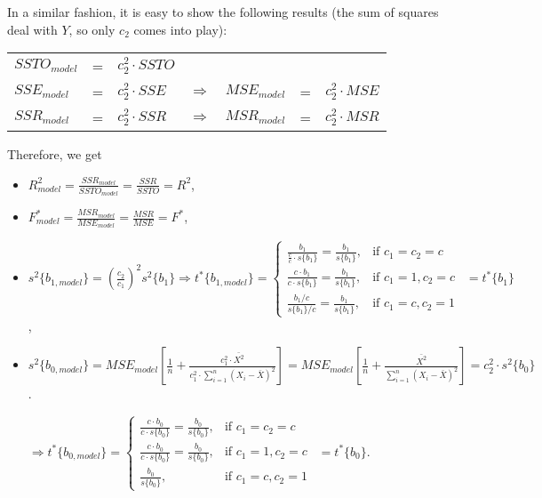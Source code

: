 \documentclass[]{article}
\begin{document}
In a similar fashion, it is easy to show the following results (the sum of squares deal with $Y$, so only $c_2$ comes into play):

\begin{tabular}{lclcccc}
$SSTO_{model}$ & = & $c_2^2 \cdot SSTO$\\
$SSE_{model}$ & = & $c_2^2 \cdot SSE$ & $\Rightarrow$ & $MSE_{model}$ & = & $c_2^2 \cdot MSE$\\
$SSR_{model}$ & = & $c_2^2 \cdot SSR$ & $\Rightarrow$ & $MSR_{model}$ & = & $c_2^2 \cdot MSR$\\
\end{tabular}

Therefore, we get

\begin{itemize}
\item $R^2_{model} = \frac{SSR_{model}}{SSTO_{model}} = \frac{SSR}{SSTO} = R^2$,

\item $F^*_{model} = \frac{MSR_{model}}{MSE_{model}} = \frac{MSR}{MSE} = F^*$,

\item $s^2\{b_{1, model}\} = (\frac{c_2}{c_1})^2 s^2\{b_1\} \Rightarrow t^*\{b_{1, model}\} = \begin{cases} \frac{b_1}{\frac{c}{c} \cdot s\{b_1\}} = \frac{b_1}{s\{b_1\}}, & \mbox{if } c_1 = c_2 = c \\ \frac{c \cdot b_1}{c \cdot s\{b_1\}} = \frac{b_1}{s\{b_1\}}, & \mbox{if } c_1 = 1, c_2 = c \\ \frac{b_1 / c}{s\{b_1\} / c} = \frac{b_1}{s\{b_1\}}, & \mbox{if } c_1 = c, c_2 = 1 \end{cases}\ \  = t^*\{b_1\}$,

\item $s^2\{b_{0, model}\} = MSE_{model}[\frac{1}{n} + \frac{c_1^2 \cdot \bar{X^2}}{c_1^2 \cdot \sum_{i=1}^n{(X_i - \bar{X})^2}}] = MSE_{model}[\frac{1}{n} + \frac{\bar{X^2}}{\sum_{i=1}^n{(X_i - \bar{X})^2}}] = c_2^2 \cdot s^2\{b_0\}$.

$\Rightarrow t^*\{b_{0, model}\} = \begin{cases} \frac{c \cdot b_0}{c \cdot s\{b_0\}} = \frac{b_0}{s\{b_0\}}, & \mbox{if } c_1 = c_2 = c \\ \frac{c \cdot b_0}{c \cdot s\{b_0\}} = \frac{b_0}{s\{b_0\}}, & \mbox{if } c_1 = 1, c_2 = c \\ \frac{b_0}{s\{b_0\}}, & \mbox{if } c_1 = c, c_2 = 1 \end{cases}\ \  = t^*\{b_0\}$.

\end{itemize}
\end{document}
